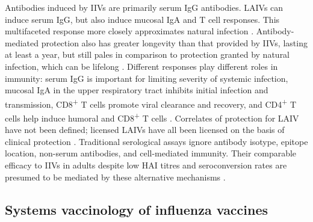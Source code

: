 Antibodies induced by \glspl{IIV} are primarily serum IgG antibodies.
\Glspl{LAIV} can induce serum IgG, but also induce mucosal IgA and T cell responses.
This multifaceted response more closely approximates natural infection \autocite{houser2015InfluenzaVaccinesChallenges,krammer2019HumanAntibodyResponse}.
Antibody-mediated protection also has greater longevity than that provided by \glspl{IIV}, lasting at least a year,
but still pales in comparison to protection granted by natural infection, which can be lifelong \autocite{luke2018InfluenzaVaccineLive, krammer2019HumanAntibodyResponse}.
Different responses play different roles in immunity:
serum IgG is important for limiting severity of systemic infection, 
mucosal IgA in the upper respiratory tract inhibits initial infection and transmission, 
CD8\textsuperscript{+} T cells promote viral clearance and recovery,
and CD4\textsuperscript{+} T cells help induce humoral and CD8\textsuperscript{+} T cells
\textcite{renegar2004RoleIgAIgG,sano2017RoadMoreEffective,krammer2018Influenza,bresee2018InactivatedInfluenzaVaccines}.
Correlates of protection for \gls{LAIV} have not been defined;
licensed \glspl{LAIV} have all been licensed on the basis of clinical protection \autocite{luke2018InfluenzaVaccineLive,krammer2019HumanAntibodyResponse}.
Traditional serological assays ignore antibody isotype, epitope location, non-serum antibodies, and cell-mediated immunity.
Their comparable efficacy to \glspl{IIV} in adults despite low \gls{HAI} titres and seroconversion rates are presumed to be mediated by these alternative mechanisms \autocite{krammer2019HumanAntibodyResponse}.

\subsection{Systems vaccinology of influenza vaccines}

